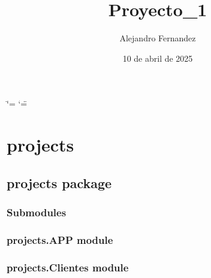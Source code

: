 \documentclass[letterpaper,10pt,spanish]{sphinxmanual}
\title{Proyecto\_1}
\date{10 de abril de 2025}
\author{Alejandro Fernandez}
\begin{document}
\ifdefined\shorthandoff
  \ifnum\catcode`\=\string=\active\shorthandoff{=}\fi
  \ifnum\catcode`\"=\active{}\fi
\fi

\pagestyle{empty}
\sphinxmaketitle
\pagestyle{plain}
\sphinxtableofcontents
\pagestyle{normal}
\label{\detokenize{index::doc}}


\sphinxstepscope


\chapter{projects}
\label{\detokenize{modules:projects}}\label{\detokenize{modules::doc}}
\sphinxstepscope


\section{projects package}
\label{\detokenize{projects:projects-package}}\label{\detokenize{projects::doc}}

\subsection{Submodules}
\label{\detokenize{projects:submodules}}

\subsection{projects.APP module}
\label{\detokenize{projects:projects-app-module}}

\subsection{projects.Clientes module}
\label{\detokenize{projects:module-projects.Clientes}}\label{\detokenize{projects:projects-clientes-module}}
\end{document}
